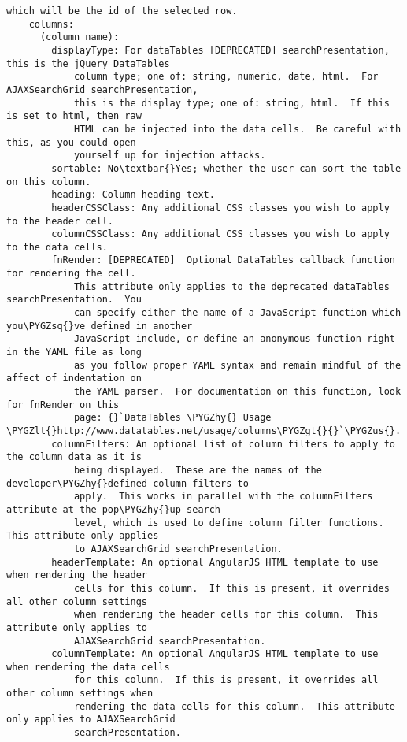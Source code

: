 \documentclass[letterpaper,10pt,english]{sphinxmanual}
\def\PYGZus{\char`\_}
\def\PYGZlt{\char`\<}
\def\PYGZgt{\char`\>}
\def\PYGZhy{\char`\-}
\def\PYGZsq{\char`\'}
\renewcommand\PYGZsq{\textquotesingle}
\begin{document}
\begin{Verbatim}[commandchars=\\\{\}]
        which will be the id of the selected row.
    columns:
      (column name):
        displayType: For dataTables [DEPRECATED] searchPresentation, this is the jQuery DataTables
            column type; one of: string, numeric, date, html.  For AJAXSearchGrid searchPresentation,
            this is the display type; one of: string, html.  If this is set to html, then raw
            HTML can be injected into the data cells.  Be careful with this, as you could open
            yourself up for injection attacks.
        sortable: No\textbar{}Yes; whether the user can sort the table on this column.
        heading: Column heading text.
        headerCSSClass: Any additional CSS classes you wish to apply to the header cell.
        columnCSSClass: Any additional CSS classes you wish to apply to the data cells.
        fnRender: [DEPRECATED]  Optional DataTables callback function for rendering the cell.
            This attribute only applies to the deprecated dataTables searchPresentation.  You
            can specify either the name of a JavaScript function which you\PYGZsq{}ve defined in another
            JavaScript include, or define an anonymous function right in the YAML file as long
            as you follow proper YAML syntax and remain mindful of the affect of indentation on
            the YAML parser.  For documentation on this function, look for fnRender on this
            page: {}`DataTables \PYGZhy{} Usage \PYGZlt{}http://www.datatables.net/usage/columns\PYGZgt{}{}`\PYGZus{}.
        columnFilters: An optional list of column filters to apply to the column data as it is
            being displayed.  These are the names of the developer\PYGZhy{}defined column filters to
            apply.  This works in parallel with the columnFilters attribute at the pop\PYGZhy{}up search
            level, which is used to define column filter functions.  This attribute only applies
            to AJAXSearchGrid searchPresentation.
        headerTemplate: An optional AngularJS HTML template to use when rendering the header
            cells for this column.  If this is present, it overrides all other column settings
            when rendering the header cells for this column.  This attribute only applies to
            AJAXSearchGrid searchPresentation.
        columnTemplate: An optional AngularJS HTML template to use when rendering the data cells
            for this column.  If this is present, it overrides all other column settings when
            rendering the data cells for this column.  This attribute only applies to AJAXSearchGrid
            searchPresentation.

\end{Verbatim}
\end{document}
